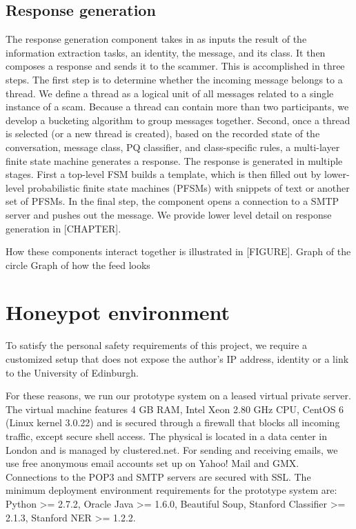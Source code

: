 \subsection*{Response generation}
The response generation component takes in as inputs the result of the information extraction tasks, an identity, the message, and its class. It then composes a response and sends it to the scammer. This is accomplished in three steps. The first step is to determine whether the incoming message belongs to a thread. We define a thread as a logical unit of all messages related to a single instance of a scam. Because a thread can contain more than two participants, we develop a bucketing algorithm to group messages together. Second, once a thread is selected (or a new thread is created), based on the recorded state of the conversation, message class, PQ classifier, and class-specific rules, a multi-layer finite state machine generates a response. The response is generated in multiple stages. First a top-level FSM builds a template, which is then filled out by lower-level probabilistic finite state machines (PFSMs) with snippets of text or another set of PFSMs. In the final step, the component opens a connection to a SMTP server and pushes out the message. We provide lower level detail on response generation in [CHAPTER].

How these components interact together is illustrated in [FIGURE].
Graph of the circle 
Graph of how the feed looks

\section{Honeypot environment}

To satisfy the personal safety requirements of this project, we require a customized setup that does not expose the author's IP address, identity or a link to the University of Edinburgh.

For these reasons, we run our prototype system on a leased virtual private server. The virtual machine features 4 GB RAM, Intel Xeon 2.80 GHz CPU, CentOS 6 (Linux kernel 3.0.22) and is secured through a firewall that blocks all incoming traffic, except secure shell access. The physical  is located in a data center in London and is managed by clustered.net. For sending and receiving emails, we use free anonymous email accounts set up on Yahoo! Mail and GMX. Connections to the POP3 and SMTP servers are secured with SSL. The minimum deployment environment requirements for the prototype system are: Python >= 2.7.2, Oracle Java >= 1.6.0, Beautiful Soup, Stanford Classifier >= 2.1.3, Stanford NER >= 1.2.2. 